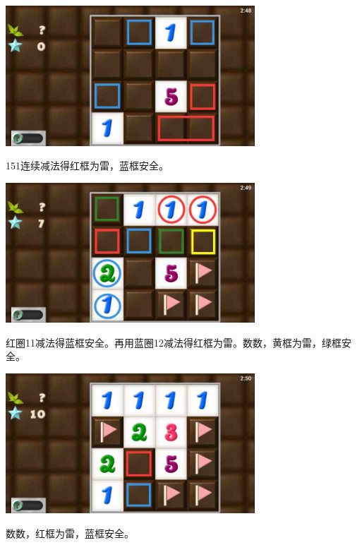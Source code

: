 \subsection{} %
\begin{center}
    \includegraphics[width=0.7\textwidth]{puzzlelow/34-1.jpg}
\end{center}
151连续减法得红框为雷，蓝框安全。
\begin{center}
    \includegraphics[width=0.7\textwidth]{puzzlelow/34-2.jpg}
\end{center}
红圈11减法得蓝框安全。再用蓝圈12减法得红框为雷。数数，黄框为雷，绿框安全。
\begin{center}
    \includegraphics[width=0.7\textwidth]{puzzlelow/34-3.jpg}
\end{center}
数数，红框为雷，蓝框安全。

